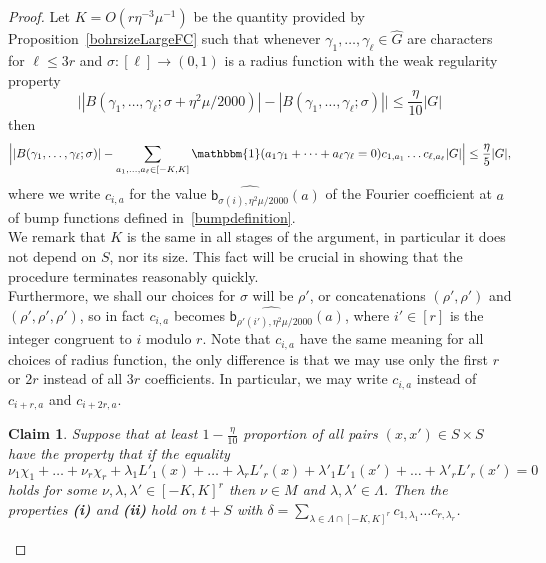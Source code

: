 \documentclass[a4paper,11pt]{article}
\numberwithin{theorem}{section}
\newtheorem{claim}[theorem]{Claim}
\theoremstyle{definition}
\newcommand\id{\mathbbm{1}}
\begin{document}
\begin{proof}
Let $K = O(r\eta^{-3}\mu^{-1})$ be the quantity provided by Proposition~\ref{bohrsizeLargeFC} such that whenever $\gamma_1, \dots, \gamma_\ell \in \hat{G}$ are characters for $\ell \leq 3r$ and $\sigma : [\ell] \to (0,1)$ is a radius function with the weak regularity property
\begin{equation}\Big||B(\gamma_1, \dots, \gamma_\ell; \sigma + \eta^2 \mu/2000)| - |B(\gamma_1, \dots, \gamma_\ell; \sigma)|\Big| \leq \frac{\eta}{10} |G|\label{wregconditionQR}\end{equation}
then 
\begin{equation}\label{QRbohrconclusion}\Big||B(\gamma_1, \dots, \gamma_\ell; \sigma)| - \sum_{a_1, \dots, a_\ell \in [-K, K]} \id(a_1 \gamma_1 + \dots + a_\ell \gamma_\ell = 0) c_{1, a_1} \dots c_{\ell, a_\ell} |G|\Big| \leq \frac{\eta}{5}|G|,\end{equation}
where we write $c_{i, a}$ for the value $\widehat{\mathsf{b}_{\sigma(i), \eta^2 \mu/2000}}(a)$ of the Fourier coefficient at $a$ of bump functions defined in~\eqref{bumpdefinition}.\\

\indent We remark that $K$ is the same in all stages of the argument, in particular it does not depend on $S$, nor its size. This fact will be crucial in showing that the procedure terminates reasonably quickly.\\

\indent Furthermore, we shall our choices for $\sigma$ will be $\rho'$, or concatenations $(\rho', \rho')$ and $(\rho', \rho', \rho')$, so in fact $c_{i, a}$ becomes $\widehat{\mathsf{b}_{\rho'(i'), \eta^2 \mu/2000}}(a)$, where $i' \in [r]$ is the integer congruent to $i$ modulo $r$. Note that $c_{i, a}$ have the same meaning for all choices of radius function, the only difference is that we may use only the first $r$ or $2r$ instead of all $3r$ coefficients. In particular, we may write $c_{i, a}$ instead of $c_{i + r, a}$ and $c_{i + 2r, a}$.


\vspace{\baselineskip}

\begin{claim}\label{qrsuffconds}Suppose that at least $1 - \frac{\eta}{10}$ proportion of all pairs $(x, x') \in S \times S$ have the property that if the equality
\begin{equation}\nu_1 \chi_1 + \dots + \nu_r \chi_r + \lambda_1 L'_1(x) + \dots + \lambda_r L'_r(x) + \lambda'_1 L'_1(x') + \dots + \lambda'_r L'_r(x') = 0\label{latticeclaimproperty}\end{equation}
holds for some $\nu, \lambda, \lambda' \in [-K, K]^r$ then $\nu \in M$ and $\lambda, \lambda' \in \Lambda$. Then the properties \textbf{(i)} and \textbf{(ii)} hold on $t + S$ with $\delta = \sum_{\lambda \in \Lambda \cap [-K, K]^r} c_{1, \lambda_1} \dots c_{r, \lambda_r}$.
\end{claim}


\end{proof}
\end{document}
